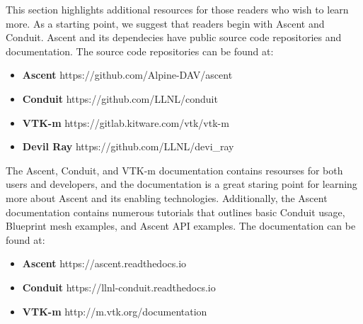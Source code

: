 This section highlights additional resources for those readers who
wish to learn more.
%
As a starting point, we suggest that readers begin with Ascent and
Conduit.
%
Ascent and its dependecies have public source code repositories and
documentation.
%
The source code repositories can be found at:
\begin{itemize}
  \item \textbf{Ascent} https://github.com/Alpine-DAV/ascent
  \item \textbf{Conduit} https://github.com/LLNL/conduit
  \item \textbf{VTK-m} https://gitlab.kitware.com/vtk/vtk-m
  \item \textbf{Devil Ray} https://github.com/LLNL/devi\_ray
\end{itemize}

The Ascent, Conduit, and VTK-m documentation contains resourses for both users and
developers, and the documentation is a great staring point for learning more about
Ascent and its enabling technologies.
%
Additionally, the Ascent documentation contains numerous tutorials that
outlines basic Conduit usage, Blueprint mesh examples, and Ascent API examples.
The documentation can be found at:
\begin{itemize}
  \item \textbf{Ascent} https://ascent.readthedocs.io
  \item \textbf{Conduit} https://llnl-conduit.readthedocs.io
  \item \textbf{VTK-m} http://m.vtk.org/documentation
\end{itemize}
